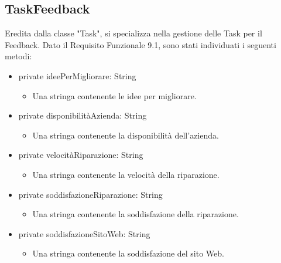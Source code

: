 \documentclass{report}
\begin{document}
\subsection*{TaskFeedback}
Eredita dalla classe "Task", si specializza nella gestione delle Task per il Feedback. Dato il Requisito Funzionale 9.1, sono stati individuati i seguenti metodi:
\begin{itemize}

\item private ideePerMigliorare: String
\begin{itemize}
	\item Una stringa contenente le idee per migliorare.
\end{itemize}
\item private disponibilitàAzienda: String
\begin{itemize}
	\item Una stringa contenente la disponibilità dell'azienda.
\end{itemize}
\item private velocitàRiparazione: String
\begin{itemize}
	\item Una stringa contenente la velocità della riparazione.
\end{itemize}
\item private soddisfazioneRiparazione: String
\begin{itemize}
	\item Una stringa contenente la soddisfazione della riparazione.
\end{itemize}
\item private soddisfazioneSitoWeb: String
\begin{itemize}
	\item Una stringa contenente la soddisfazione del sito Web.
\end{itemize}


\end{itemize}
\end{document}
